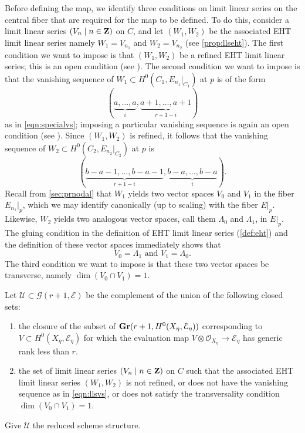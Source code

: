 \documentclass[11pt,reqno]{amsart}
\theoremstyle{plain}
\theoremstyle{definition}
\theoremstyle{remark}
\numberwithin{equation}{section}
\renewcommand{\to}{{\longrightarrow}}
\numberwithin{equation}{section}
\renewcommand{\O}{\mathcal O}
\begin{document}
Before defining the map, we identify three conditions on limit linear series on the central fiber that are required for the map to be defined.
To do this, consider a limit linear series $(V_n \mid n \in {\bf Z})$ on $C$, and let $(W_1, W_2)$ be the associated EHT limit linear series namely $W_1 = V_{n_1}$ and $W_2 = V_{n_2}$ (see \autoref{prop:llseht}).
The first condition we want to impose is that $(W_1, W_2)$ be a refined EHT limit linear series; this is an open condition (see \cite[Proposition~4.1.5]{oss:14}).
The second condition we want to impose is that the vanishing sequence of $W_1 \subset H^0(C_1, E_{n_1}|_{C_1})$ at $p$ is of the form
\begin{equation}\label{eqn:llsvs}
  (\underbrace{a, \dots, a}_i, \underbrace{a+1, \dots, a+1}_{r+1-i})
\end{equation}
as in \eqref{eqn:specialvs}; imposing a particular vanishing sequence is again an open condition (see \cite[Proposition~4.2.5]{oss:14}).
Since $(W_1, W_2)$ is refined, it follows that the vanishing sequence of $W_2 \subset H^0(C_2, E_{n_2}|_{C_2})$ at $p$ is
\[ (\underbrace{b-a-1, \dots, b-a-1}_{r+1-i}, \underbrace{b-a, \dots, b-a}_{i}).\]
Recall from \autoref{sec:prnodal} that $W_1$ yields two vector spaces $V_0$ and $V_1$ in the fiber $E_{n_1}|_p$, which we may identify canonically (up to scaling) with the fiber $E|_p$.
Likewise, $W_2$ yields two analogous vector spaces, call them $\Lambda_0$ and $\Lambda_1$, in $E|_p$.
The gluing condition in the definition of EHT limit linear series (\autoref{def:eht}) and the definition of these vector spaces immediately shows that
\begin{equation}\label{eqn:vlambdaswitch}
  V_0 = \Lambda_1 \text{ and } V_1 = \Lambda_0.
\end{equation}
The third condition we want to impose is that these two vector spaces be transverse, namely $\dim (V_0 \cap V_1) = 1$.

Let $\mathcal U \subset {\mathcal G}(r+1, \mathcal E)$ be the complement of the union of the following closed sets:
\begin{enumerate}
\item the closure of the subset of ${\bf Gr}(r+1, H^0(X_\eta, \mathcal E_\eta))$ corresponding to $V \subset H^0(X_\eta, \mathcal E_\eta)$ for which the evaluation map $V\otimes\O_{X_\eta} \to \mathcal E_\eta$ has generic rank less than $r$.
\item the set of limit linear series $(V_n \mid n \in {\bf Z})$ on $C$ such that the associated EHT limit linear series $(W_1, W_2)$ is not refined, or does not have the vanishing sequence as in \eqref{eqn:llsvs}, or does not satisfy the transversality condition $\dim (V_0 \cap V_1) = 1$.
\end{enumerate}
Give $\mathcal U$ the reduced scheme structure.
\end{document}

